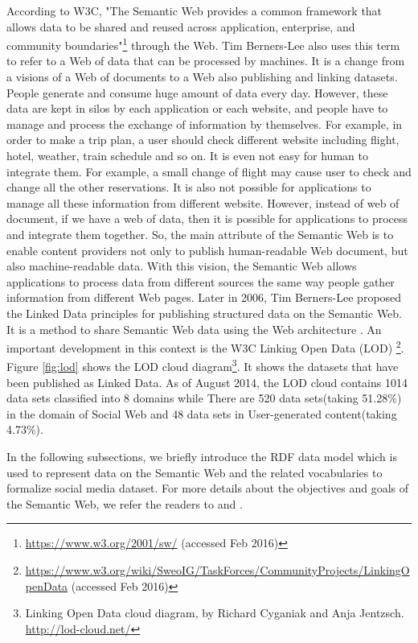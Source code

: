 According to W3C, "The Semantic Web provides a common framework that allows data to be shared and reused across application, enterprise, and community boundaries"\footnote{\url{https://www.w3.org/2001/sw/} (accessed Feb 2016)} through the Web. Tim Berners-Lee \cite{berners2001semantic} also uses this term to refer to a Web of data that can be processed by machines. It is a change from a visions of a Web of documents to a Web also publishing and linking datasets. People generate and consume huge amount of data every day. However, these data are kept in silos by each application or each website, and people have to manage and process the exchange of information by themselves. For example, in order to make a trip plan, a user should check different website including flight, hotel, weather, train schedule and so on. It is even not easy for human to integrate them. For example, a small change of flight may cause user to check and change all the other reservations. It is also not possible for applications to manage all these information from different website. However, instead of web of document, if we have a web of data, then it is possible for applications to process and integrate them together. So, the main attribute of the Semantic Web is to enable content providers not only to publish human-readable Web document, but also machine-readable data. With this vision, the Semantic Web allows applications to process data from different sources the same way people gather information from different Web pages. Later in 2006, Tim Berners-Lee\cite{berners2006linked} proposed the Linked Data principles for publishing structured data on the Semantic Web. It is a method to share Semantic Web data using the Web architecture \cite{bizer2011evolving}. An important development in this context is the W3C Linking Open Data (LOD) \footnote{\url{https://www.w3.org/wiki/SweoIG/TaskForces/CommunityProjects/LinkingOpenData} (accessed Feb 2016)}. Figure \ref{fig:lod} shows the LOD cloud diagram\footnote{Linking Open Data cloud diagram, by Richard Cyganiak and Anja Jentzsch. \url{http://lod-cloud.net/}}. It shows the datasets that have been published as Linked Data. As of August 2014, the LOD cloud contains 1014 data sets classified into 8 domains while There are 520 data sets(taking 51.28\%) in the domain of Social Web and 48 data sets in User-generated content(taking 4.73\%).


In the following subsections, we briefly introduce the RDF data model which is used to represent data on the Semantic Web and the related vocabularies to formalize social media dataset. For more details about the objectives and goals of the Semantic Web, we refer the readers to \cite{feigenbaum2007semantic} and \cite{berners2001semantic}.

